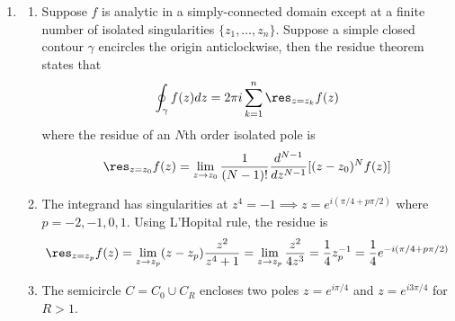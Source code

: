 \documentclass[a4paper]{article}
\begin{document}
\begin{ans}\leavevmode
\begin{enumerate}[label=(\alph*)]
\item
\begin{enumerate}[label=(\roman*)]
\item 
Suppose $f$ is analytic in a simply-connected domain except at a finite number of isolated singularities $\{z_1,\dots,z_n\}$. Suppose a simple closed contour $\gamma$ encircles the origin anticlockwise, then the residue theorem states that
$$\oint_\gamma f(z)dz=2\pi i\sum_{k=1}^n\res_{z=z_k}f(z)$$
where the residue of an $N$th order isolated pole is
$$\res_{z=z_0}f(z)=\lim_{z\rightarrow z_0}\frac{1}{(N-1)!}\frac{d^{N-1}}{dz^{N-1}}[(z-z_0)^Nf(z)]$$
\item The integrand has singularities at $z^4=-1\implies z=e^{i(\pi/4+p\pi/2)}$ where $p=-2,-1,0,1$. Using L'Hopital rule, the residue is
$$\res_{z=z_p}f(z)=\lim_{z\rightarrow z_p}(z-z_p)\frac{z^2}{z^4+1}=\lim_{z\rightarrow z_p}\frac{z^2}{4z^3}=\frac{1}{4}z_p^{-1}=\frac{1}{4}e^{-i(\pi/4+p\pi/2)}$$
\item The semicircle $C=C_0\cup C_R$ encloses two poles $z=e^{i\pi/4}$ and $z=e^{i3\pi/4}$ for $R>1$.
\begin{center}
\end{center}
\end{enumerate}
\end{enumerate}
\end{ans}
\end{document}
